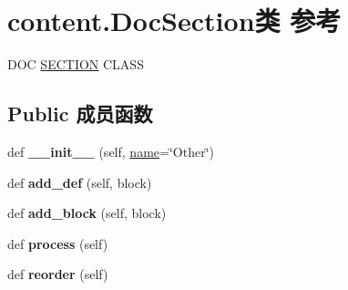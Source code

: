 \hypertarget{classcontent_1_1_doc_section}{}\section{content.\+Doc\+Section类 参考}
\label{classcontent_1_1_doc_section}


D\+OC \hyperlink{struct_s_e_c_t_i_o_n}{S\+E\+C\+T\+I\+ON} C\+L\+A\+SS  


\subsection*{Public 成员函数}
\begin{DoxyCompactItemize}
\item 
\mbox{\label{classcontent_1_1_doc_section_a1389757afe38b9898b5cf4de4a018bd6}} 
def {\bfseries \+\_\+\+\_\+init\+\_\+\+\_\+} (self, \hyperlink{structname}{name}=\char`\"{}Other\char`\"{})
\item 
\mbox{\label{classcontent_1_1_doc_section_a5133093b86b3fd50704855238815e3ef}} 
def {\bfseries add\+\_\+def} (self, block)
\item 
\mbox{\label{classcontent_1_1_doc_section_a440c733dacc9a97041c551a3a9aed217}} 
def {\bfseries add\+\_\+block} (self, block)
\item 
\mbox{\label{classcontent_1_1_doc_section_aabd75dff1c6ef88d3168e100cb19b924}} 
def {\bfseries process} (self)
\item 
\mbox{\label{classcontent_1_1_doc_section_a934270932ad675acddee9f09b1e8af80}} 
def {\bfseries reorder} (self)
\end{DoxyCompactItemize}
